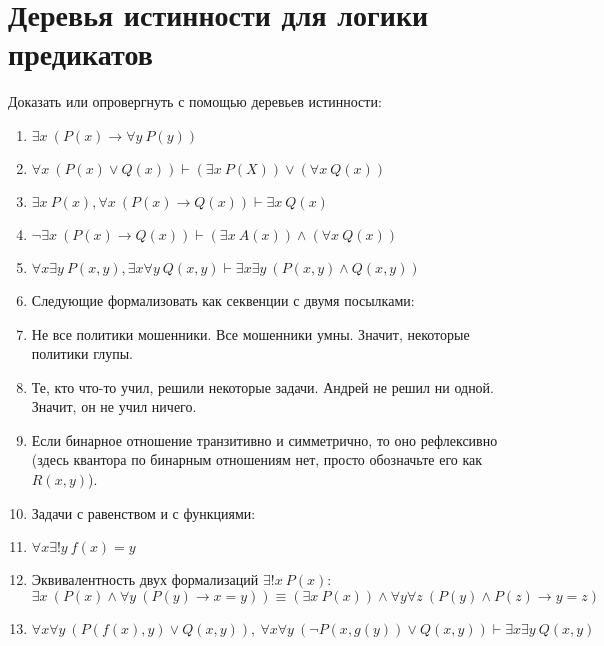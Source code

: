\documentclass{article}
\newcommand{\itemhard}{\refstepcounter{enumi}\item[\theenumi$^\star$.]}
\begin{document}
\section{Деревья истинности для логики предикатов}
Доказать или опровергнуть с помощью деревьев истинности:
\begin{enumerate}
    \item $\exists x~(P(x) \to \forall y~P(y))$
    \item $\forall x~(P(x) \vee Q(x)) \vdash (\exists x~P(X)) \vee (\forall x~Q(x))$
    \item $\exists x~P(x), \forall x~(P(x) \to Q(x)) \vdash \exists x~Q(x)$
    \item $\neg \exists x~(P(x) \to Q(x)) \vdash (\exists x~A(x)) \land (\forall x~Q(x))$
    \item $\forall x \exists y~P(x,y), \exists x \forall y~Q(x,y) \vdash \exists x \exists y~(P(x,y) \land Q(x,y))$
    \item[] Следующие формализовать как секвенции с двумя посылками:
    \item Не все политики мошенники. Все мошенники умны. Значит, некоторые политики глупы.
    \item Те, кто что-то учил, решили некоторые задачи. Андрей не решил ни одной. Значит, он не учил ничего.
    \item Если бинарное отношение транзитивно и симметрично, то оно рефлексивно (здесь квантора по бинарным отношениям нет, просто обозначьте его как $R(x,y)$).
    \item[] Задачи с равенством и с функциями:
    \item $\forall x \exists! y~f(x)=y$
    \item Эквивалентность двух формализаций $\exists! x~P(x)$:\\$\exists x~(P(x) \land \forall y~(P(y) \to x=y)) \equiv (\exists x~P(x)) \land \forall y \forall z~(P(y) \land P(z) \to y=z)$
    \itemhard $\forall x \forall y~(P(f(x), y) \vee Q(x,y)),~\forall x \forall y~(\neg P(x,g(y)) \vee Q(x,y)) \vdash \exists x \exists y~Q(x,y)$
\end{enumerate}
\end{document}
